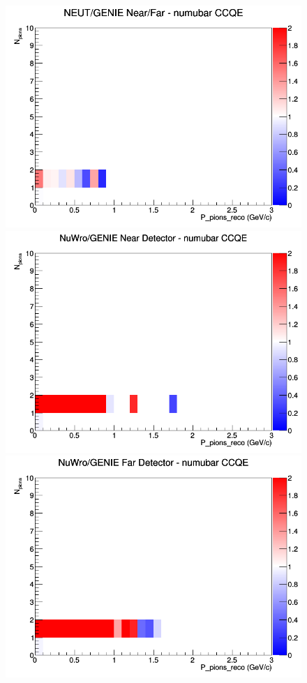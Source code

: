\documentclass[12pt]{article}
\begin{document}
\begin{figure}[h]
\endminipage
{}
\includegraphics[width=\linewidth]{eff_N_P/FGT/pions/ratios/CCQE_NEUT_GENIE_numubar_NF_N_P.png}
\endminipage
\newline
{}
\includegraphics[width=\linewidth]{eff_N_P/FGT/pions/ratios/CCQE_NuWro_GENIE_numubar_near_N_P.png}
\endminipage
{}
\includegraphics[width=\linewidth]{eff_N_P/FGT/pions/ratios/CCQE_NuWro_GENIE_numubar_far_N_P.png}

\end{figure}
\end{document}
